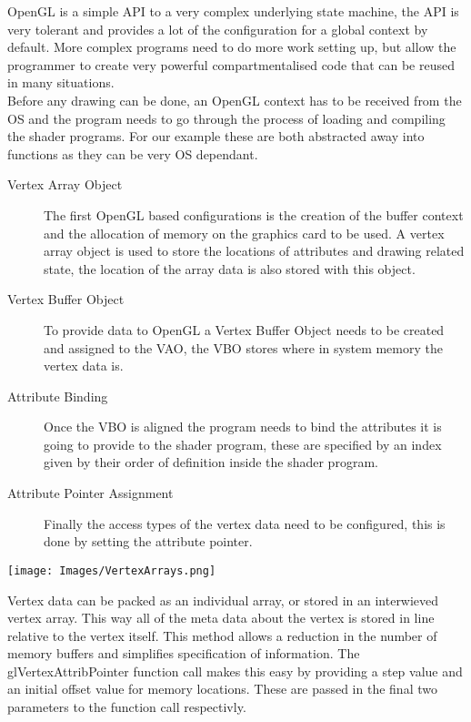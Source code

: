 OpenGL is a simple API to a very complex underlying state machine, the API is 
very tolerant and provides a lot of the configuration for a global context by 
default. More complex programs need to do more work setting up, but allow the
programmer to create very powerful compartmentalised code that can be reused in 
many situations.\\

Before any drawing can be done, an OpenGL context has to be received from the OS
and the program needs to go through the process of loading and compiling the 
shader programs. For our example these are both abstracted away into functions as
they can be very OS dependant.  \\

\begin{description}
\item[Vertex Array Object] The first OpenGL based configurations is the 
creation of the buffer context and the allocation of memory on the graphics card
to be used. A vertex array object is used to store the locations of attributes 
and drawing related state, the location of the array data is also stored with
this object.
\item[Vertex Buffer Object]
To provide data to OpenGL a Vertex Buffer Object needs to be created
and assigned to the VAO, the VBO stores where in system memory the vertex data 
is. 
\item[Attribute Binding]
Once the VBO is aligned the program needs to bind the attributes it is going
to provide to the shader program, these are specified by an index given by their
order of definition inside the shader program.
\item[Attribute Pointer Assignment]
Finally the access types of the 
vertex data need to be configured, this is done by setting the attribute 
pointer. 
\end{description}

\begin{center}
\texttt{[image: Images/VertexArrays.png]}
\end{center}

Vertex data can be packed as an individual array, or stored in an interwieved 
vertex array. This way all of the meta data about the vertex is stored in line 
relative to the vertex itself. This method allows a reduction in the number of 
memory buffers and simplifies specification of information. The 
glVertexAttribPointer function call makes this easy by providing a step value and
an initial offset value for memory locations. These are passed in the final two
parameters to the function call respectivly.\\



